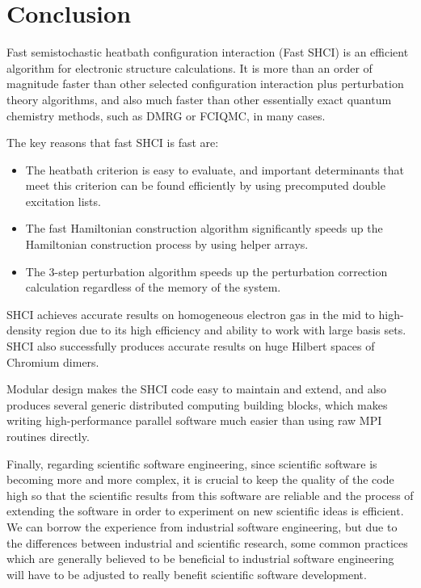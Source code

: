 \documentclass[phd,tocprelim]{cornell}
\begin{document}







\chapter{Conclusion}
\label{ch:con}

Fast semistochastic heatbath configuration interaction (Fast SHCI) is an efficient algorithm for electronic structure calculations.
It is more than an order of magnitude faster than other selected configuration interaction plus perturbation theory algorithms, and also much faster than other essentially exact quantum chemistry methods, such as DMRG or FCIQMC, in many cases.

The key reasons that fast SHCI is fast are:
\begin{itemize}
    \item The heatbath criterion is easy to evaluate, and important determinants that meet this criterion can be found efficiently by using precomputed double excitation lists.
    \item The fast Hamiltonian construction algorithm significantly speeds up the Hamiltonian construction process by using helper arrays.
    \item The 3-step perturbation algorithm speeds up the perturbation correction calculation regardless of the memory of the system.
\end{itemize}

SHCI achieves accurate results on homogeneous electron gas in the mid to high-density region due to its high efficiency and ability to work with large basis sets.
SHCI also successfully produces accurate results on huge Hilbert spaces of Chromium dimers.

Modular design makes the SHCI code easy to maintain and extend, and also produces several generic distributed computing building blocks, which makes writing high-performance parallel software much easier than using raw MPI routines directly.

Finally, regarding scientific software engineering, since scientific software is becoming more and more complex, it is crucial to keep the quality of the code high so that the scientific results from this software are reliable and the process of extending the software in order to experiment on new scientific ideas is efficient.
We can borrow the experience from industrial software engineering, but due to the differences between industrial and scientific research, some common practices which are generally believed to be beneficial to industrial software engineering will have to be adjusted to really benefit scientific software development.


\end{document}
